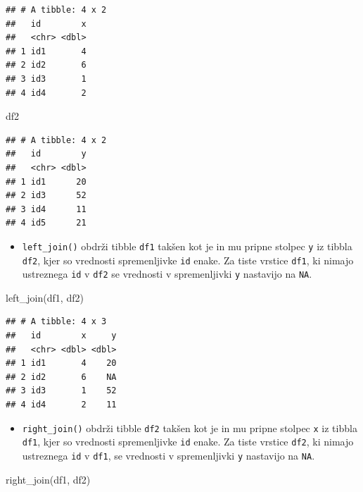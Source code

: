 \documentclass[
]{book}
\newenvironment{Shaded}{\begin{snugshade}}{\end{snugshade}}
\newcommand{\FunctionTok}[1]{\textcolor[rgb]{0.00,0.00,0.00}{#1}}
\newcommand{\NormalTok}[1]{#1}
\providecommand{\tightlist}{%
  \setlength{\itemsep}{0pt}\setlength{\parskip}{0pt}}
\begin{document}
\begin{verbatim}
## # A tibble: 4 x 2
##   id        x
##   <chr> <dbl>
## 1 id1       4
## 2 id2       6
## 3 id3       1
## 4 id4       2
\end{verbatim}

\begin{Shaded}
\begin{Highlighting}[]
\NormalTok{df2}
\end{Highlighting}
\end{Shaded}

\begin{verbatim}
## # A tibble: 4 x 2
##   id        y
##   <chr> <dbl>
## 1 id1      20
## 2 id3      52
## 3 id4      11
## 4 id5      21
\end{verbatim}

\begin{itemize}
\tightlist
\item
  \texttt{left\_join()} obdrži tibble \texttt{df1} takšen kot je in mu pripne stolpec \texttt{y} iz tibbla \texttt{df2}, kjer so vrednosti spremenljivke \texttt{id} enake. Za tiste vrstice \texttt{df1}, ki nimajo ustreznega \texttt{id} v \texttt{df2} se vrednosti v spremenljivki \texttt{y} nastavijo na \texttt{NA}.
\end{itemize}

\begin{Shaded}
\begin{Highlighting}[]
\FunctionTok{left\_join}\NormalTok{(df1, df2)}
\end{Highlighting}
\end{Shaded}

\begin{verbatim}
## # A tibble: 4 x 3
##   id        x     y
##   <chr> <dbl> <dbl>
## 1 id1       4    20
## 2 id2       6    NA
## 3 id3       1    52
## 4 id4       2    11
\end{verbatim}

\begin{itemize}
\tightlist
\item
  \texttt{right\_join()} obdrži tibble \texttt{df2} takšen kot je in mu pripne stolpec \texttt{x} iz tibbla \texttt{df1}, kjer so vrednosti spremenljivke \texttt{id} enake. Za tiste vrstice \texttt{df2}, ki nimajo ustreznega \texttt{id} v \texttt{df1}, se vrednosti v spremenljivki \texttt{y} nastavijo na \texttt{NA}.
\end{itemize}

\begin{Shaded}
\begin{Highlighting}[]
\FunctionTok{right\_join}\NormalTok{(df1, df2)}
\end{Highlighting}
\end{Shaded}
\end{document}
